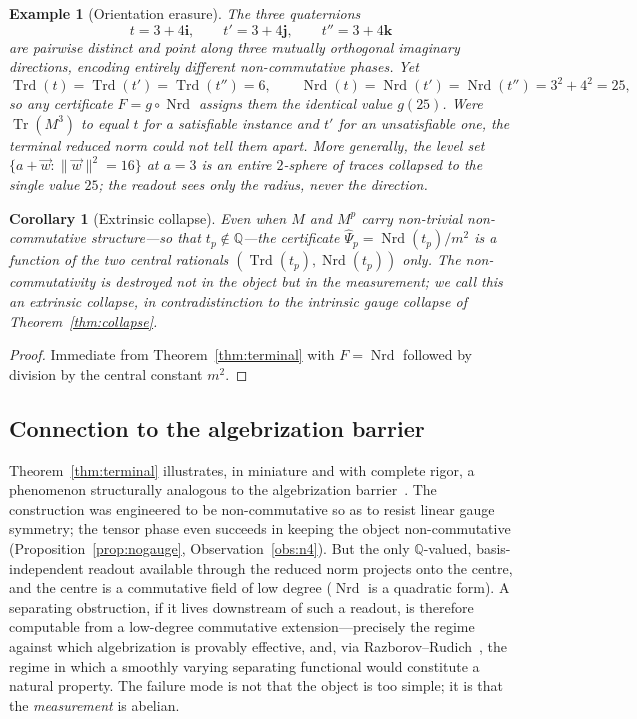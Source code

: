 \documentclass[pdflatex,sn-mathphys-num]{sn-jnl}
\theoremstyle{thmstyleone}%
\newtheorem{corollary}[theorem]{Corollary}%
\theoremstyle{thmstyletwo}%
\newtheorem{example}{Example}%
\theoremstyle{thmstylethree}%
\newcommand{\QQ}{\mathbb{Q}}
\newcommand{\Nrd}{\operatorname{Nrd}}
\newcommand{\Trd}{\operatorname{Trd}}
\newcommand{\Tr}{\operatorname{Tr}}
\newcommand{\bi}{\mathbf{i}}
\newcommand{\bj}{\mathbf{j}}
\newcommand{\bk}{\mathbf{k}}
\begin{document}
\begin{example}[Orientation erasure]\label{ex:erase}
The three quaternions
\[
  t=3+4\bi,\qquad t'=3+4\bj,\qquad t''=3+4\bk
\]
are pairwise distinct and point along three mutually orthogonal imaginary
directions, encoding entirely different non-commutative phases. Yet
\[
  \Trd(t)=\Trd(t')=\Trd(t'')=6,\qquad
  \Nrd(t)=\Nrd(t')=\Nrd(t'')=3^2+4^2=25,
\]
so any certificate $F=g\circ\Nrd$ assigns them the identical value
$g(25)$. Were $\Tr(M^3)$ to equal $t$ for a satisfiable instance and $t'$
for an unsatisfiable one, the terminal reduced norm could not tell them
apart. More generally, the level set $\{a+\vec w:\lVert\vec
w\rVert^2=16\}$ at $a=3$ is an entire $2$-sphere of traces collapsed to the
single value $25$; the readout sees only the radius, never the direction.
\end{example}

\begin{corollary}[Extrinsic collapse]\label{cor:extrinsic}
Even when $M$ and $M^p$ carry non-trivial non-commutative structure---so
that $t_p\notin\QQ$---the certificate $\widehat\Psi_p=\Nrd(t_p)/m^2$ is a
function of the two central rationals $(\Trd(t_p),\Nrd(t_p))$ only. The
non-commutativity is destroyed not in the object but in the measurement;
we call this an \emph{extrinsic} collapse, in contradistinction to the
intrinsic gauge collapse of Theorem~\ref{thm:collapse}.
\end{corollary}

\begin{proof}
Immediate from Theorem~\ref{thm:terminal} with $F=\Nrd$ followed by division
by the central constant $m^2$.
\end{proof}

\subsection{Connection to the algebrization barrier}

Theorem~\ref{thm:terminal} illustrates, in miniature and with complete rigor,
a phenomenon structurally analogous to the algebrization barrier~\cite{AW}.
The construction was
engineered to be non-commutative so as to resist linear gauge symmetry; the
tensor phase even succeeds in keeping the object non-commutative
(Proposition~\ref{prop:nogauge}, Observation~\ref{obs:n4}). But the only
$\QQ$-valued, basis-independent readout available through the reduced norm
projects onto the centre, and the centre is a commutative field of low
degree ($\Nrd$ is a quadratic form). A separating obstruction, if it lives
downstream of such a readout, is therefore computable from a low-degree
commutative extension---precisely the regime against which algebrization is
provably effective, and, via Razborov--Rudich~\cite{RR}, the regime in which
a smoothly varying separating functional would constitute a natural
property. The failure mode is not that the object is too simple; it is that the
\emph{measurement} is abelian.
\end{document}

